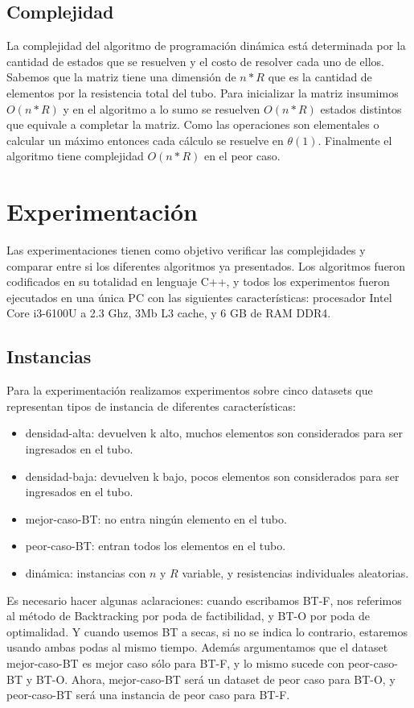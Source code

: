 \documentclass[10pt,a4paper]{article}
\begin{document}
\subsection{Complejidad}
La complejidad del algoritmo de programación dinámica está determinada por la cantidad de estados que se resuelven y el costo de resolver cada uno de ellos.
Sabemos que la matriz tiene una dimensión de $n * R$ que es la cantidad de elementos por la resistencia total del tubo. Para inicializar la matriz insumimos $O(n * R)$ y en el algoritmo a lo sumo se resuelven $O(n * R)$ estados distintos que equivale a completar la matriz. Como las operaciones son elementales o calcular un máximo entonces cada cálculo se resuelve en $\theta(1)$. Finalmente el algoritmo tiene complejidad $O(n * R)$ en el peor caso.

\section{Experimentación} \label{sec:experimentacion}
Las experimentaciones tienen como objetivo verificar las complejidades y comparar entre si los diferentes algoritmos ya presentados. Los algoritmos fueron codificados en su totalidad en lenguaje C++, y todos los experimentos fueron ejecutados en una única PC con las siguientes características: procesador Intel Core i3-6100U a 2.3 Ghz, 3Mb L3 cache, y 6 GB de RAM DDR4.

\subsection{Instancias} \label{instancias}
Para la experimentación realizamos experimentos sobre cinco datasets que representan tipos de instancia de diferentes características:
\begin{itemize}
	\item densidad-alta: devuelven k alto, muchos elementos son considerados para ser ingresados en el tubo.
	\item densidad-baja: devuelven k bajo, pocos elementos son considerados para ser ingresados en el tubo.
	\item mejor-caso-BT: no entra ningún elemento en el tubo.
	\item peor-caso-BT: entran todos los elementos en el tubo.
	\item dinámica: instancias con $n$ y $R$ variable, y resistencias individuales aleatorias.
\end{itemize}
Es necesario hacer algunas aclaraciones: cuando escribamos BT-F, nos referimos al método de Backtracking por poda de factibilidad, y BT-O por poda de optimalidad. Y cuando usemos BT a secas, si no se indica lo contrario, estaremos usando ambas podas al mismo tiempo.\newline
Además argumentamos que el dataset mejor-caso-BT es mejor caso sólo para BT-F, y lo mismo sucede con peor-caso-BT y BT-O. Ahora, mejor-caso-BT será un dataset de peor caso para BT-O, y peor-caso-BT será una instancia de peor caso para BT-F.
\end{document}
